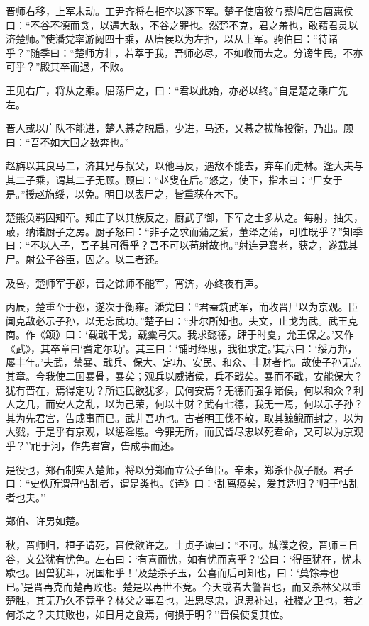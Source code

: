 \documentclass[]{article}
\begin{document}
晋师右移，上军未动。工尹齐将右拒卒以逐下军。楚子使唐狡与蔡鸠居告唐惠侯曰：``不谷不德而贪，以遇大敌，不谷之罪也。然楚不克，君之羞也，敢藉君灵以济楚师。''使潘党率游阙四十乘，从唐侯以为左拒，以从上军。驹伯曰：``待诸乎？''随季曰：``楚师方壮，若萃于我，吾师必尽，不如收而去之。分谤生民，不亦可乎？''殿其卒而退，不败。

王见右广，将从之乘。屈荡尸之，曰：``君以此始，亦必以终。''自是楚之乘广先左。

晋人或以广队不能进，楚人惎之脱扃，少进，马还，又惎之拔旆投衡，乃出。顾曰：``吾不如大国之数奔也。''

赵旃以其良马二，济其兄与叔父，以他马反，遇敌不能去，弃车而走林。逢大夫与其二子乘，谓其二子无顾。顾曰：``赵叟在后。''怒之，使下，指木曰：``尸女于是。''授赵旃绥，以免。明日以表尸之，皆重获在木下。

楚熊负羁囚知荦。知庄子以其族反之，厨武子御，下军之士多从之。每射，抽矢，菆，纳诸厨子之房。厨子怒曰：``非子之求而蒲之爱，董泽之蒲，可胜既乎？''知季曰：``不以人子，吾子其可得乎？吾不可以苟射故也。''射连尹襄老，获之，遂载其尸。射公子谷臣，囚之。以二者还。

及昏，楚师军于邲，晋之馀师不能军，宵济，亦终夜有声。

丙辰，楚重至于邲，遂次于衡雍。潘党曰：``君盍筑武军，而收晋尸以为京观。臣闻克敌必示子孙，以无忘武功。''楚子曰：``非尔所知也。夫文，止戈为武。武王克商。作《颂》曰：`载戢干戈，载櫜弓矢。我求懿德，肆于时夏，允王保之。'又作《武》，其卒章曰`耆定尔功'。其三曰：`铺时绎思，我徂求定。'其六曰：`绥万邦，屡丰年。'夫武，禁暴、戢兵、保大、定功、安民、和众、丰财者也。故使子孙无忘其章。今我使二国暴骨，暴矣；观兵以威诸侯，兵不戢矣。暴而不戢，安能保大？犹有晋在，焉得定功？所违民欲犹多，民何安焉？无德而强争诸侯，何以和众？利人之几，而安人之乱，以为己荣，何以丰财？武有七德，我无一焉，何以示子孙？其为先君宫，告成事而已。武非吾功也。古者明王伐不敬，取其鲸鲵而封之，以为大戮，于是乎有京观，以惩淫慝。今罪无所，而民皆尽忠以死君命，又可以为京观乎？''祀于河，作先君宫，告成事而还。

是役也，郑石制实入楚师，将以分郑而立公子鱼臣。辛未，郑杀仆叔子服。君子曰：``史佚所谓毋怙乱者，谓是类也。《诗》曰：`乱离瘼矣，爰其适归？'归于怙乱者也夫。''

郑伯、许男如楚。

秋，晋师归，桓子请死，晋侯欲许之。士贞子谏曰：``不可。城濮之役，晋师三日谷，文公犹有忧色。左右曰：`有喜而忧，如有忧而喜乎？'公曰：`得臣犹在，忧未歇也。困兽犹斗，况国相乎！'及楚杀子玉，公喜而后可知也，曰：`莫馀毒也已。'是晋再克而楚再败也。楚是以再世不竞。今天或者大警晋也，而又杀林父以重楚胜，其无乃久不竞乎？林父之事君也，进思尽忠，退思补过，社稷之卫也，若之何杀之？夫其败也，如日月之食焉，何损于明？''晋侯使复其位。
\end{document}
